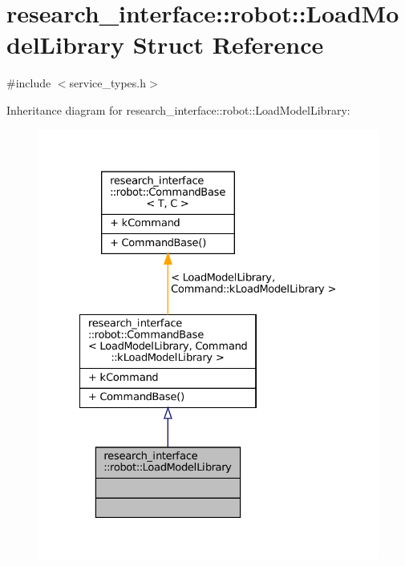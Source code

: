 \hypertarget{structresearch__interface_1_1robot_1_1LoadModelLibrary}{}\section{research\+\_\+interface\+:\+:robot\+:\+:Load\+Model\+Library Struct Reference}
\label{structresearch__interface_1_1robot_1_1LoadModelLibrary}


{\ttfamily \#include $<$service\+\_\+types.\+h$>$}



Inheritance diagram for research\+\_\+interface\+:\+:robot\+:\+:Load\+Model\+Library\+:
\nopagebreak
\begin{figure}[H]
\begin{center}
\leavevmode
\includegraphics[width=328pt]{structresearch__interface_1_1robot_1_1LoadModelLibrary__inherit__graph}
\end{center}
\end{figure}


